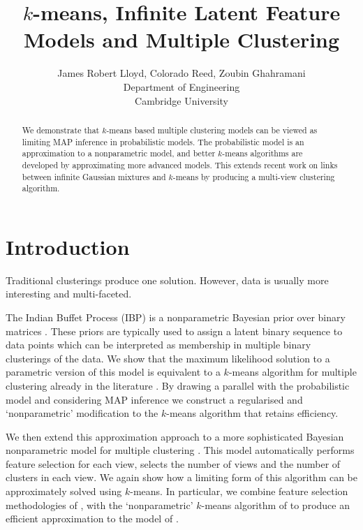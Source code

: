 \documentclass{article}
\title{
$k$-means, Infinite Latent Feature Models and Multiple Clustering
}
\author{
James Robert Lloyd, Colorado Reed, Zoubin Ghahramani\\
Department of Engineering\\
Cambridge University\\
}
\numberwithin{equation}{section}
\numberwithin{thm}{section}
\begin{document}
\maketitle

\begin{abstract}
We demonstrate that $k$-means based multiple clustering models can be viewed as limiting MAP inference in probabilistic models.
The probabilistic model is an approximation to a nonparametric model, and better $k$-means algorithms are developed by approximating more advanced models.
This extends recent work on links between infinite Gaussian mixtures and $k$-means by producing a multi-view clustering algorithm.
\end{abstract}

\section{Introduction}

Traditional clusterings \citep[e.g.][]{Jain2000} produce one solution.
However, data is usually more interesting and multi-faceted.

The Indian Buffet Process (IBP) is a nonparametric Bayesian prior over binary matrices \citep[e.g.][]{Griffiths2011}.
These priors are typically used to assign a latent binary sequence to data points which can be interpreted as membership in multiple binary clusterings of the data.
We show that the maximum likelihood solution to a parametric version of this model is equivalent to a $k$-means algorithm for multiple clustering already in the literature \citep{Cui2007}.
By drawing a parallel with the probabilistic model and considering MAP inference we construct a regularised \citep[e.g.][]{Sun2012} and `nonparametric' modification to the $k$-means algorithm that retains efficiency.

We then extend this approximation approach to a more sophisticated Bayesian nonparametric model for multiple clustering \citep{Niu2012}.
This model automatically performs feature selection for each view, selects the number of views and the number of clusters in each view.
We again show how a limiting form of this algorithm can be approximately solved using $k$-means.
In particular, we combine feature selection methodologies of \citep{Dy2004}, with the `nonparametric' $k$-means algorithm of \cite{Kulis2012} to produce an efficient approximation to the model of \cite{Niu2012}.
\end{document}
